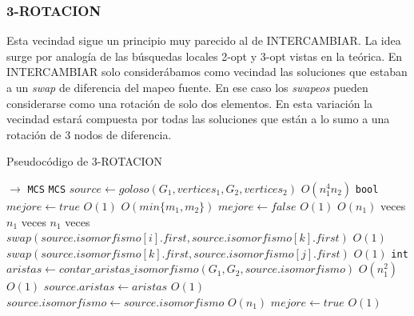 \subsubsection{3-ROTACION}
Esta vecindad sigue un principio muy parecido al de INTERCAMBIAR. La idea surge por analogía de las búsquedas locales 2-opt y 3-opt vistas en la teórica. En INTERCAMBIAR solo considerábamos como vecindad las soluciones que estaban a un \emph{swap} de diferencia del mapeo fuente. En ese caso los \emph{swapeos} pueden considerarse como una rotación de solo dos elementos. En esta variación la vecindad estará compuesta por todas las soluciones que están a lo sumo a una rotación de 3 nodos de diferencia.

\begin{algorithm}[H]
  \small
  \begin{algorithmic}[1]
  \caption{Pseudocódigo de 3-ROTACION}
  \label{algo:5-3}
    $\rightarrow$ \texttt{MCS}
      \State \texttt{MCS} $source \gets goloso(G_1, vertices_1, G_2, vertices_2)$
      \Comment $O(n_1^4n_2)$
      \State \texttt{bool} $mejore \gets true$
      \Comment $O(1)$
      \Comment $O(min\{m_1, m_2\})$
        \State $mejore \gets false$
        \Comment $O(1)$
        \Comment $O(n_1)$ veces
          \Comment $n_1$ veces
            \Comment $n_1$ veces
              \State $swap(source.isomorfismo[i].first, source.isomorfismo[k].first)$
              \Comment $O(1)$
              \State $swap(source.isomorfismo[k].first, source.isomorfismo[j].first)$
              \Comment $O(1)$
              \State \texttt{int} $aristas \gets contar\_aristas\_isomorfismo(G_1, G_2, source.isomorfismo)$
              \Comment $O(n_1^2)$
              \Comment $O(1)$
                \State $source.aristas \gets aristas$ 
                \Comment $O(1)$             
                \State $source.isomorfismo \gets source.isomorfismo$
                \Comment $O(n_1)$
                \State $mejore \gets true$
                \Comment $O(1)$
              \EndIf
            \EndFor
          \EndFor
        \EndFor
      \EndWhile
    \EndProcedure
  \end{algorithmic}
\end{algorithm}

